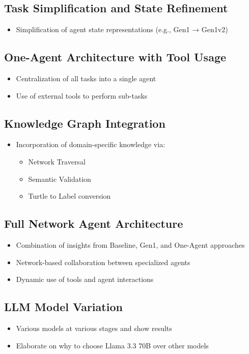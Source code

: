 \documentclass[a4paper,oneside,bibliography=totoc]{scrbook}
\begin{document}
\subsection{Task Simplification and State Refinement}
\begin{itemize}
  \item Simplification of agent state representations (e.g., Gen1 → Gen1v2)
\end{itemize}

\subsection{One-Agent Architecture with Tool Usage}
\begin{itemize}
  \item Centralization of all tasks into a single agent
  \item Use of external tools to perform sub-tasks
\end{itemize}

\subsection{Knowledge Graph Integration}
\begin{itemize}
  \item Incorporation of domain-specific knowledge via:
        \begin{itemize}
          \item Network Traversal
          \item Semantic Validation
          \item Turtle to Label conversion
        \end{itemize}
\end{itemize}

\subsection{Full Network Agent Architecture}
\begin{itemize}
  \item Combination of insights from Baseline, Gen1, and One-Agent approaches
  \item Network-based collaboration between specialized agents
  \item Dynamic use of tools and agent interactions
\end{itemize}

\subsection{LLM Model Variation}
\begin{itemize}
  \item Various models at various stages and show results
  \item Elaborate on why to choose Llama 3.3 70B over other models
\end{itemize}
\end{document}
